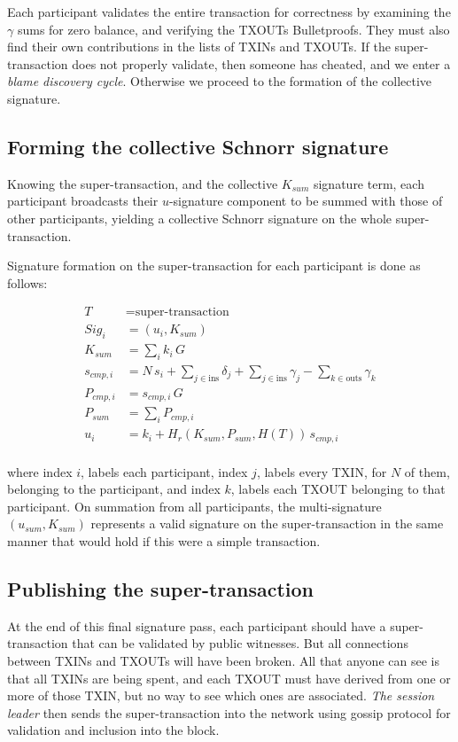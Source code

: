\documentclass[8pt,fleqn,openany]{book}
\begin{document}
Each participant validates the entire transaction for correctness by examining the $\gamma$ sums for zero balance, and verifying the TXOUTs Bulletproofs. They must also find their own contributions in the lists of TXINs and TXOUTs. If the super-transaction does not properly validate, then someone has cheated, and we enter a \textit{blame discovery cycle}. Otherwise we proceed to the formation of the collective signature. 

\subsection{Forming the collective Schnorr signature} 
Knowing the super-transaction, and the collective $K_{sum}$ signature term, each participant broadcasts their $u$-signature component to be summed with those of other participants, yielding a collective Schnorr signature on the whole super-transaction.

Signature formation on the super-transaction for each participant is done as follows:

\begin{align*}
T &= \text{super-transaction} \\
Sig_i &= (u_i, K_{sum}) \\
K_{sum} &= \sum_i{k_i \, G} \\
s_{cmp,i} &= N \, s_i + \sum_{j \in \text{ins}} {\delta_j} + \sum_{j \in \text{ins}} {\gamma_j} - \sum_{k \in \text{outs}} {\gamma_k} \\
P_{cmp,i} &= s_{cmp,i} \, G \\
P_{sum} &= \sum_i{P_{cmp,i}}\\
u_i &= k_i + H_r(K_{sum} , P_{sum},  H(T)) \,  s_{cmp,i}\\
\end{align*}

where index $i$, labels each participant, index $j$, labels every TXIN, for $N$ of them, belonging to the participant, and index $k$, labels each TXOUT belonging to that participant. On summation from all participants, the multi-signature $(u_{sum}, K_{sum})$ represents a valid signature on the super-transaction in the same manner that would hold if this were a simple transaction.

\subsection{Publishing the super-transaction} 
At the end of this final signature pass, each participant should have a super-transaction that can be validated by public witnesses. But all connections between TXINs and TXOUTs will have been broken. All that anyone can see is that all TXINs are being spent, and each TXOUT must have derived from one or more of those TXIN, but no way to see which ones are associated. \textit{The session leader} then sends the super-transaction into the network using gossip protocol for validation and inclusion into the block.
\end{document}
